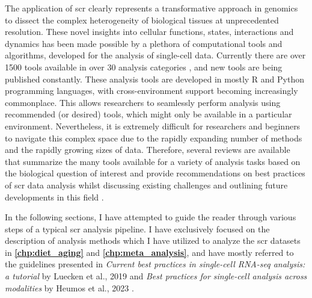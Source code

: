 The application of \gls{scr} clearly represents a transformative approach in genomics to dissect the complex heterogeneity of biological tissues at unprecedented resolution. These novel insights into cellular functions, states, interactions and dynamics has been made possible by  a plethora of computational tools and algorithms, developed for the analysis of single-cell data. Currently there are over 1500 tools available in over 30 analysis categories \textbf{\cite{noauthor_scrna-tools_nodate}}, and new tools are being published constantly. These analysis tools are developed in mostly R and Python programming languages, with cross-environment support becoming increasingly commonplace. This allows researchers to seamlessly perform analysis using recommended (or desired) tools, which might only be available in a particular environment. Nevertheless, it is extremely difficult for researchers and beginners to navigate this complex space due to the rapidly expanding number of methods and the rapidly growing sizes of data. Therefore, several reviews are available that summarize the many tools available for a variety of analysis tasks based on the biological question of interest and provide recommendations on best practices of \gls{scr} data analysis whilst discussing existing challenges and outlining future developments in this field \textbf{\cite{zappia_exploring_2018,wu_tools_2020,balzer_how_2021,su_data_2022,ke_single_2022,lueckenmalte_d_current_2019,heumos_best_2023}}.

\vspace{0.2cm}

\begin{Abstract}
\vspace{3mm}
In the following sections, I have attempted to guide the reader through various steps of a typical \gls{scr} analysis pipeline. I have exclusively focused on the description of analysis methods which I have utilized to analyze the \gls{scr} datasets in \textbf{\autoref{chp:diet_aging}} and \textbf{\autoref{chp:meta_analysis}}, and have mostly referred to the guidelines presented in \textit{Current best practices in single-cell RNA-seq analysis: a tutorial} by Luecken et al., 2019 \textbf{\cite{lueckenmalte_d_current_2019}} and \textit{Best practices for single-cell analysis across modalities} by Heumos et al., 2023 \textbf{\cite{heumos_best_2023}}.
\vspace{3mm}
\end{Abstract}

\vspace{3mm}


